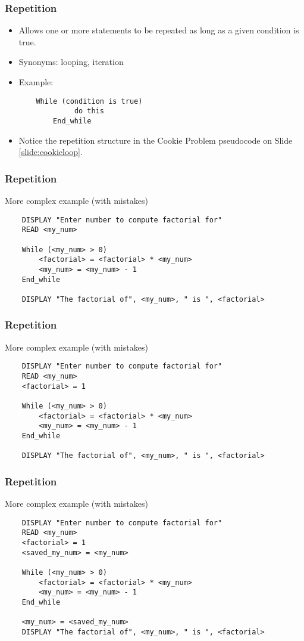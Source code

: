 \documentclass[graphics]{beamer}
\begin{document}
\begin{frame}[fragile]\frametitle{Repetition}
    \begin{itemize}
        \item Allows one or more statements to be repeated as long as a given condition is true.
        \item Synonyms:  looping, iteration
        \item Example:
        \begin{verbatim}
    While (condition is true)
  		     do this
  		End_while
        \end{verbatim}
        \item Notice the repetition structure in the Cookie Problem pseudocode on Slide \ref{slide:cookieloop}.
    \end{itemize}
\end{frame}

\begin{frame}[fragile]\frametitle{Repetition}
    More complex example (with mistakes)
    \begin{verbatim}
    DISPLAY "Enter number to compute factorial for"
    READ <my_num>
    
    While (<my_num> > 0)
        <factorial> = <factorial> * <my_num>
        <my_num> = <my_num> - 1
    End_while
    
    DISPLAY "The factorial of", <my_num>, " is ", <factorial>
    \end{verbatim}
\end{frame}

\begin{frame}[fragile]\frametitle{Repetition}
    More complex example (with mistakes)
    \begin{verbatim}
    DISPLAY "Enter number to compute factorial for"
    READ <my_num>
    <factorial> = 1
    
    While (<my_num> > 0)
        <factorial> = <factorial> * <my_num>
        <my_num> = <my_num> - 1
    End_while
    
    DISPLAY "The factorial of", <my_num>, " is ", <factorial>
    \end{verbatim}
\end{frame}

\begin{frame}[fragile]\frametitle{Repetition}
    More complex example (with mistakes)
    \begin{verbatim}
    DISPLAY "Enter number to compute factorial for"
    READ <my_num>
    <factorial> = 1
    <saved_my_num> = <my_num>
    
    While (<my_num> > 0)
        <factorial> = <factorial> * <my_num>
        <my_num> = <my_num> - 1
    End_while
    
    <my_num> = <saved_my_num>
    DISPLAY "The factorial of", <my_num>, " is ", <factorial>
    \end{verbatim}
\end{frame}
\end{document}
